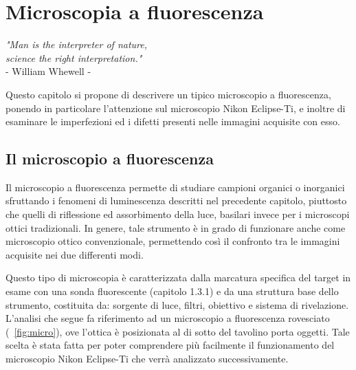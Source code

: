 \clearpage{\pagestyle{empty}\cleardoublepage}

\chapter{Microscopia a fluorescenza}

\begin{flushright}\begin{small}\textit{"Man is the interpreter of nature,\\ 
science the right interpretation."}\\
- William Whewell -\\
\end{small}\end{flushright}

Questo capitolo si propone di descrivere un tipico microscopio a fluorescenza, ponendo in particolare l'attenzione sul microscopio Nikon Eclipse-Ti, e inoltre di esaminare le imperfezioni ed i difetti presenti nelle immagini acquisite con esso.

\section {Il microscopio a fluorescenza}

Il microscopio a fluorescenza permette di studiare campioni organici o inorganici sfruttando i fenomeni di luminescenza descritti nel precedente capitolo, piuttosto che quelli di riflessione ed assorbimento della luce, basilari invece per i microscopi ottici tradizionali. 
In genere, tale strumento è in grado di funzionare anche come microscopio ottico convenzionale, permettendo così il confronto tra le immagini acquisite nei due differenti modi.

Questo tipo di microscopia è caratterizzata dalla marcatura specifica del target in esame con una sonda fluorescente (capitolo 1.3.1) e da una struttura base dello strumento, costituita da: sorgente di luce, filtri, obiettivo e sistema di rivelazione. 
L'analisi che segue fa riferimento ad un microscopio a fluorescenza rovesciato (\figurename~\ref{fig:micro}), ove l'ottica è posizionata al di sotto del tavolino porta oggetti. 
Tale scelta è stata fatta per poter comprendere più facilmente il funzionamento del microscopio Nikon Eclipse-Ti che verrà analizzato successivamente.

